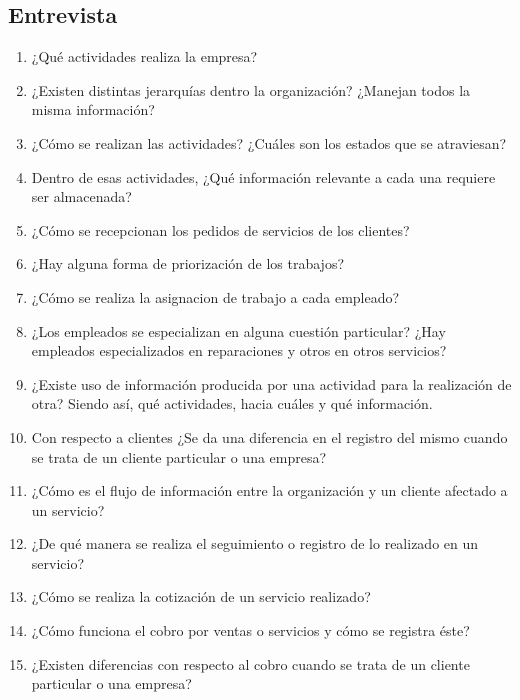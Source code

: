 \documentclass[12pt]{extarticle}
\begin{document}
    \begin{spacing}{1.2}


        \newcommand\OT{\textit{Orden de Trabajo}}
        \newcommand\OTs{\textit{Órdenes de Trabajo}}


    \section{Entrevista}
    \begin{enumerate}
        \item ¿Qué actividades realiza la empresa?
        \item ¿Existen distintas jerarquías dentro la organización? ¿Manejan todos la misma información?
        \item ¿Cómo se realizan las actividades? ¿Cuáles son los estados que se atraviesan?
        \item Dentro de esas actividades, ¿Qué información relevante a cada una requiere ser almacenada?
        \item ¿Cómo se recepcionan los pedidos de servicios de los clientes?
        \item ¿Hay alguna forma de priorización de los trabajos?
        \item ¿Cómo se realiza la asignacion de trabajo a cada empleado? 
        \item ¿Los empleados se especializan en alguna cuestión particular? ¿Hay empleados especializados en reparaciones y otros en otros servicios? 
        \item ¿Existe uso de información producida por una actividad para la realización de otra? Siendo así, qué actividades, hacia cuáles y qué información.
        \item Con respecto a clientes ¿Se da una diferencia en el registro del mismo cuando se trata de un cliente particular o una empresa?
        \item ¿Cómo es el flujo de información entre la organización y un cliente afectado a un servicio?
        \item ¿De qué manera se realiza el seguimiento o registro de lo realizado en un servicio?
        \item ¿Cómo se realiza la cotización de un servicio realizado?
        \item ¿Cómo funciona el cobro por ventas o servicios y cómo se registra éste?
        \item ¿Existen diferencias con respecto al cobro cuando se trata de un cliente particular o una empresa?

\end{enumerate}
\end{spacing}
\end{document}
